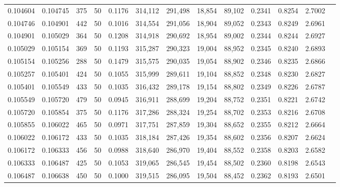 \begin{tabular}{rrrrrrrrrrrrr}
0.104604 & 0.104745 &   375 &  50 &                                     0.1176 & 314,112 & 291,498 &  18,854 &  89,102 & 0.2341 & 0.8254 & 2.7002 \\
0.104746 & 0.104901 &   442 &  50 &                                     0.1016 & 314,554 & 291,056 &  18,904 &  89,052 & 0.2343 & 0.8249 & 2.6961 \\
0.104901 & 0.105029 &   364 &  50 &                                     0.1208 & 314,918 & 290,692 &  18,954 &  89,002 & 0.2344 & 0.8244 & 2.6927 \\
0.105029 & 0.105154 &   369 &  50 &                                     0.1193 & 315,287 & 290,323 &  19,004 &  88,952 & 0.2345 & 0.8240 & 2.6893 \\
0.105154 & 0.105256 &   288 &  50 &                                     0.1479 & 315,575 & 290,035 &  19,054 &  88,902 & 0.2346 & 0.8235 & 2.6866 \\
0.105257 & 0.105401 &   424 &  50 &                                     0.1055 & 315,999 & 289,611 &  19,104 &  88,852 & 0.2348 & 0.8230 & 2.6827 \\
0.105401 & 0.105549 &   433 &  50 &                                     0.1035 & 316,432 & 289,178 &  19,154 &  88,802 & 0.2349 & 0.8226 & 2.6787 \\
0.105549 & 0.105720 &   479 &  50 &                                     0.0945 & 316,911 & 288,699 &  19,204 &  88,752 & 0.2351 & 0.8221 & 2.6742 \\
0.105720 & 0.105854 &   375 &  50 &                                     0.1176 & 317,286 & 288,324 &  19,254 &  88,702 & 0.2353 & 0.8216 & 2.6708 \\
0.105855 & 0.106022 &   465 &  50 &                                     0.0971 & 317,751 & 287,859 &  19,304 &  88,652 & 0.2355 & 0.8212 & 2.6664 \\
0.106022 & 0.106172 &   433 &  50 &                                     0.1035 & 318,184 & 287,426 &  19,354 &  88,602 & 0.2356 & 0.8207 & 2.6624 \\
0.106172 & 0.106333 &   456 &  50 &                                     0.0988 & 318,640 & 286,970 &  19,404 &  88,552 & 0.2358 & 0.8203 & 2.6582 \\
0.106333 & 0.106487 &   425 &  50 &                                     0.1053 & 319,065 & 286,545 &  19,454 &  88,502 & 0.2360 & 0.8198 & 2.6543 \\
0.106487 & 0.106638 &   450 &  50 &                                     0.1000 & 319,515 & 286,095 &  19,504 &  88,452 & 0.2362 & 0.8193 & 2.6501 \\

\end{tabular}
